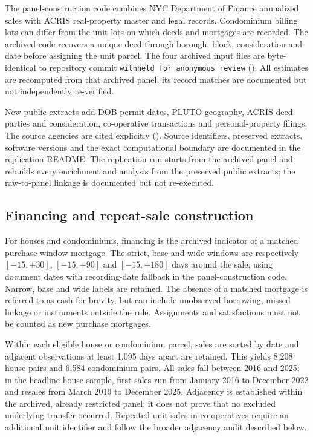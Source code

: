 \documentclass[12pt]{article}
\begin{document}
The panel-construction code combines NYC Department of Finance annualized sales with ACRIS real-property master and legal records. Condominium billing lots can differ from the unit lots on which deeds and mortgages are recorded. The archived code recovers a unique deed through borough, block, consideration and date before assigning the unit parcel. The four archived input files are byte-identical to repository commit \texttt{withheld for anonymous review} (\citealp{loschicode2026}). All estimates are recomputed from that archived panel; its record matches are documented but not independently re-verified.

New public extracts add DOB permit dates, PLUTO geography, ACRIS deed parties and consideration, co-operative transactions and personal-property filings. The source agencies are cited explicitly (\citealp{nycsales2026,acrisrp2026,acrispp2026,dob2026,pluto2026,pmms2026}). Source identifiers, preserved extracts, software versions and the exact computational boundary are documented in the replication README. The replication run starts from the archived panel and rebuilds every enrichment and analysis from the preserved public extracts; the raw-to-panel linkage is documented but not re-executed.

\subsection{Financing and repeat-sale construction}
For houses and condominiums, financing is the archived indicator of a matched purchase-window mortgage. The strict, base and wide windows are respectively $[-15,+30]$, $[-15,+90]$ and $[-15,+180]$ days around the sale, using document dates with recording-date fallback in the panel-construction code. Narrow, base and wide labels are retained. The absence of a matched mortgage is referred to as cash for brevity, but can include unobserved borrowing, missed linkage or instruments outside the rule. Assignments and satisfactions must not be counted as new purchase mortgages.

Within each eligible house or condominium parcel, sales are sorted by date and adjacent observations at least 1,095 days apart are retained. This yields 8,208 house pairs and 6,584 condominium pairs. All sales fall between 2016 and 2025; in the headline house sample, first sales run from January 2016 to December 2022 and resales from March 2019 to December 2025. Adjacency is established within the archived, already restricted panel; it does not prove that no excluded underlying transfer occurred. Repeated unit sales in co-operatives require an additional unit identifier and follow the broader adjacency audit described below.
\end{document}
